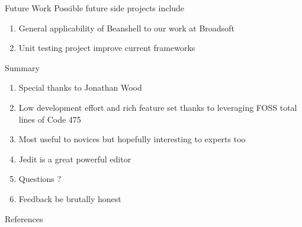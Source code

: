 \documentclass{beamer}
\begin{document}
\begin{frame}{Future Work}
Possible future side projects include
\begin{enumerate}
\item General applicability of Beanshell to our work at Broadsoft
\item Unit testing project improve current frameworks
\end{enumerate}
\end{frame}


\begin{frame}{Summary}
\begin{enumerate}
\item Special thanks to Jonathan Wood
\item Low development effort and rich feature set thanks to leveraging FOSS total lines of Code 475
\item Most useful to novices but hopefully interesting to experts too
\item Jedit is a great powerful editor
\item Questions ?
\item Feedback be brutally honest
\end{enumerate}
\end{frame}

\begin{frame}[allowframebreaks]{References}


\end{frame}
\end{document}

